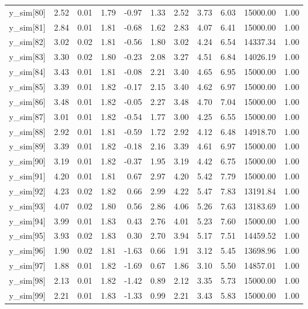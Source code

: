 \begin{table}[ht]
\begin{tabular}{rrrrrrrrrrr}
  y\_sim[80] & 2.52 & 0.01 & 1.79 & -0.97 & 1.33 & 2.52 & 3.73 & 6.03 & 15000.00 & 1.00 \\ 
  y\_sim[81] & 2.84 & 0.01 & 1.81 & -0.68 & 1.62 & 2.83 & 4.07 & 6.41 & 15000.00 & 1.00 \\ 
  y\_sim[82] & 3.02 & 0.02 & 1.81 & -0.56 & 1.80 & 3.02 & 4.24 & 6.54 & 14337.34 & 1.00 \\ 
  y\_sim[83] & 3.30 & 0.02 & 1.80 & -0.23 & 2.08 & 3.27 & 4.51 & 6.84 & 14026.19 & 1.00 \\ 
  y\_sim[84] & 3.43 & 0.01 & 1.81 & -0.08 & 2.21 & 3.40 & 4.65 & 6.95 & 15000.00 & 1.00 \\ 
  y\_sim[85] & 3.39 & 0.01 & 1.82 & -0.17 & 2.15 & 3.40 & 4.62 & 6.97 & 15000.00 & 1.00 \\ 
  y\_sim[86] & 3.48 & 0.01 & 1.82 & -0.05 & 2.27 & 3.48 & 4.70 & 7.04 & 15000.00 & 1.00 \\ 
  y\_sim[87] & 3.01 & 0.01 & 1.82 & -0.54 & 1.77 & 3.00 & 4.25 & 6.55 & 15000.00 & 1.00 \\ 
  y\_sim[88] & 2.92 & 0.01 & 1.81 & -0.59 & 1.72 & 2.92 & 4.12 & 6.48 & 14918.70 & 1.00 \\ 
  y\_sim[89] & 3.39 & 0.01 & 1.82 & -0.18 & 2.16 & 3.39 & 4.61 & 6.97 & 15000.00 & 1.00 \\ 
  y\_sim[90] & 3.19 & 0.01 & 1.82 & -0.37 & 1.95 & 3.19 & 4.42 & 6.75 & 15000.00 & 1.00 \\ 
  y\_sim[91] & 4.20 & 0.01 & 1.81 & 0.67 & 2.97 & 4.20 & 5.42 & 7.79 & 15000.00 & 1.00 \\ 
  y\_sim[92] & 4.23 & 0.02 & 1.82 & 0.66 & 2.99 & 4.22 & 5.47 & 7.83 & 13191.84 & 1.00 \\ 
  y\_sim[93] & 4.07 & 0.02 & 1.80 & 0.56 & 2.86 & 4.06 & 5.26 & 7.63 & 13183.69 & 1.00 \\ 
  y\_sim[94] & 3.99 & 0.01 & 1.83 & 0.43 & 2.76 & 4.01 & 5.23 & 7.60 & 15000.00 & 1.00 \\ 
  y\_sim[95] & 3.93 & 0.02 & 1.83 & 0.30 & 2.70 & 3.94 & 5.17 & 7.51 & 14459.52 & 1.00 \\ 
  y\_sim[96] & 1.90 & 0.02 & 1.81 & -1.63 & 0.66 & 1.91 & 3.12 & 5.45 & 13698.96 & 1.00 \\ 
  y\_sim[97] & 1.88 & 0.01 & 1.82 & -1.69 & 0.67 & 1.86 & 3.10 & 5.50 & 14857.01 & 1.00 \\ 
  y\_sim[98] & 2.13 & 0.01 & 1.82 & -1.42 & 0.89 & 2.12 & 3.35 & 5.73 & 15000.00 & 1.00 \\ 
  y\_sim[99] & 2.21 & 0.01 & 1.83 & -1.33 & 0.99 & 2.21 & 3.43 & 5.83 & 15000.00 & 1.00 \\ 

\end{tabular}
\end{table}
